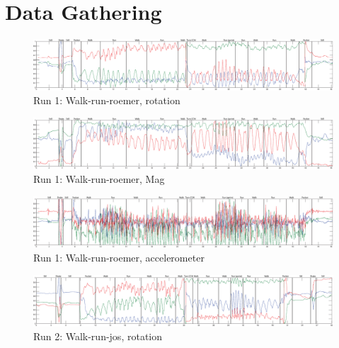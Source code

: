 \section{Data Gathering}\label{sec:data_gathering}



\begin{figure}
\centering
  \includegraphics[width=1\textwidth]{./Figures/chapter6/data_collection/run-1-walk-run-roemer/data_plot_rot_annotated.eps}
  \caption[R1: rotation]{Run 1: Walk-run-roemer, rotation}
\end{figure}

\begin{figure}
\centering
  \includegraphics[width=1\textwidth]{./Figures/chapter6/data_collection/run-1-walk-run-roemer/data_plot_mag_annotated.eps}
  \caption[R1: mag]{Run 1: Walk-run-roemer, Mag}
\end{figure}

\begin{figure}
\centering
  \includegraphics[width=1\textwidth]{./Figures/chapter6/data_collection/run-1-walk-run-roemer/data_plot_acc_annotated.eps}
  \caption[R1: accelerometer]{Run 1: Walk-run-roemer, accelerometer}
\end{figure}

\begin{figure}
\centering
  \includegraphics[width=1\textwidth]{./Figures/chapter6/data_collection/run-2-walk-run-jos/data_plot_rot_annotated.eps}
  \caption[R2: rotation]{Run 2: Walk-run-jos, rotation}
\end{figure}

